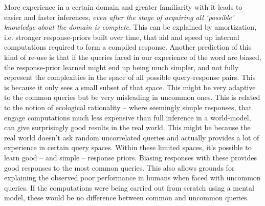 More experience in a certain domain and greater familiarity with it leads to easier and faster inferences, \textit{even after the stage of acquiring all `possible' knowledge about the domain is complete}. This can be explained by amortization, i.e. stronger response-priors built over time, that aid and speed up internal computations required to form a compiled response. Another prediction of this kind of re-use is that if the queries faced in our experience of the word are biased, the response-prior learned might end up being much simpler, and not fully represent the complexities in the space of all possible query-response pairs. This is because it only sees a small subset of that space. This might be very adaptive to the common queries but be very misleading in uncommon ones. This is related to the notion of ecological rationality -- where seemingly simple responses, that engage computations much less expensive than full inference in a world-model, can give surprisingly good results in the real world. This might be because the real world doesn't ask random uncorrelated queries and actually provides a lot of experience in certain query spaces. Within these limited spaces, it's possible to learn good -- and simple -- response priors. Biasing responses with these provides good responses to the most common queries. This also allows grounds for explaining the observed poor performance in humans when faced with uncommon queries. If the computations were being carried out from scratch using a mental model, these would be no difference between common and uncommon queries.

